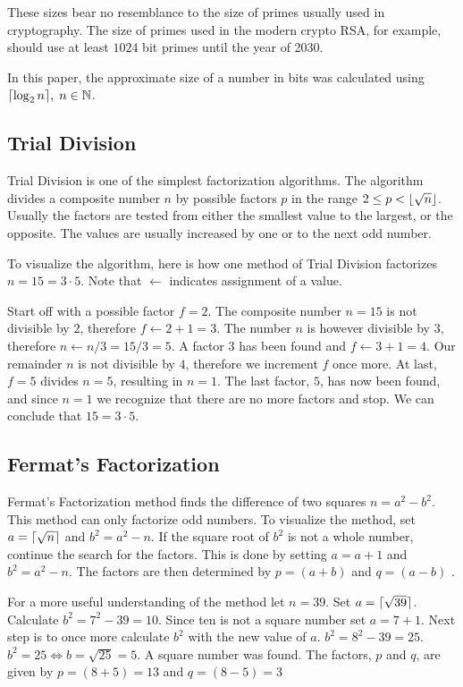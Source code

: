 These sizes bear no resemblance to the size of primes usually used in cryptography. The size of primes used in the modern crypto RSA, for example, should use at least $1024$ bit primes until the year of 2030\cite{keysize}.

In this paper, the approximate size of a number in bits was calculated using $\lceil\log_2{n}\rceil,\;n\in\mathbb{N}$.

\subsection{Trial Division}
Trial Division is one of the simplest factorization algorithms. The algorithm divides a composite number $n$ by possible factors $p$ in the range $2 \leq p < \lfloor\sqrt{n}\rfloor$. Usually the factors are tested from either the smallest value to the largest, or the opposite. The values are usually increased by one or to the next odd number\cite{trialDivisionAndFermats}.

To visualize the algorithm, here is how one method of Trial Division factorizes $n=15=3\cdot5$. Note that $\leftarrow$ indicates assignment of a value.

Start off with a possible factor $f=2$. The composite number $n=15$ is not divisible by $2$, therefore $f\leftarrow2+1=3$. The number $n$ is however divisible by $3$, therefore $n\leftarrow n/3=15/3=5$. A factor $3$ has been found and $f\leftarrow3+1=4$. Our remainder $n$ is not divisible by $4$, therefore we increment $f$ once more. At last, $f=5$ divides $n=5$, resulting in $n=1$. The last factor, $5$, has now been found, and since $n=1$ we recognize that there are no more factors and stop. We can conclude that $15=3\cdot5$.

\subsection{Fermat's Factorization}
Fermat's Factorization method finds the difference of two squares $n = a^2 - b^2$. This method can only factorize odd numbers. To visualize the method, set $a = \lceil\sqrt{n}\rceil$ and $b^2 = a^2 - n$. If the square root of $b^2$ is not a whole number, continue the search for the factors. This is done by setting $a = a + 1$ and $b^2 = a^2 - n$. The factors are then determined by $p = (a + b)$ and $q = (a - b)$ \cite{trialDivisionAndFermats}.

For a more useful understanding of the method let $n=39$. Set $a=\lceil\sqrt{39}\rceil$. Calculate $b^2 = 7^2-39 = 10$. Since ten is not a square number set $a=7+1$. Next step is to once more calculate $b^2$ with the new value of $a$. $b^2 = 8^2-39 = 25$. $b^2=25 \Leftrightarrow b=\sqrt{25} = 5$. A square number was found. The factors, $p$ and $q$, are given by $p=(8+5)=13$ and $q=(8-5)=3$ 

